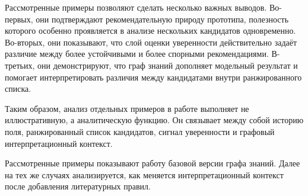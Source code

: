 Рассмотренные примеры позволяют сделать несколько важных выводов. Во-первых, они подтверждают рекомендательную природу
прототипа, полезность которого особенно проявляется в анализе нескольких кандидатов одновременно. Во-вторых, они
показывают, что слой оценки уверенности
действительно задаёт различие между более устойчивыми и более спорными рекомендациями. В-третьих, они демонстрируют,
что граф знаний дополняет модельный результат и помогает интерпретировать различия между кандидатами внутри ранжированного списка.

Таким образом, анализ отдельных примеров в работе выполняет не иллюстративную, а аналитическую функцию. Он связывает
между собой историю поля, ранжированный список кандидатов, сигнал уверенности и графовый интерпретационный контекст.

Рассмотренные примеры показывают работу базовой версии графа знаний. Далее на тех же случаях анализируется, как меняется
интерпретационный контекст после добавления литературных правил.
